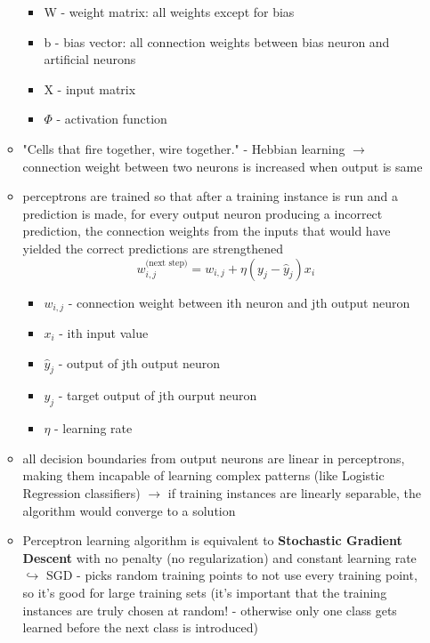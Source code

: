 \documentclass[12pt,a4paper]{article}
\begin{document}
\begin{itemize}
\begin{itemize}
    \begin{itemize}
      \item W - weight matrix: all weights except for bias
      \item b - bias vector: all connection weights between bias neuron and artificial neurons
      \item X - input matrix
      \item $\Phi$ - activation function
    \end{itemize}
    \item "Cells that fire together, wire together." - Hebbian learning
    \newline \indent $\longrightarrow$ connection weight between two neurons is increased when output is same
    \item perceptrons are trained so that after a training instance is run and a prediction is made, for every output neuron producing a incorrect prediction, the connection weights from the inputs that would have yielded the correct predictions are strengthened
    \begin{equation}
      w_{i, j}^{\text{(next step)}} = w_{i, j} + \eta(y_j - \hat y_j) x_i
    \end{equation}
    \begin{itemize}
      \item $w_{i, j}$ - connection weight between ith neuron and jth output neuron
      \item $x_i$ - ith input value
      \item $\hat y_j$ - output of jth output neuron
      \item $y_j$ - target output of jth ourput neuron
      \item $\eta$ - learning rate
    \end{itemize}
    \item all decision boundaries from output neurons are linear in perceptrons, making them incapable of learning complex patterns (like Logistic Regression classifiers)
    \newline \indent $\longrightarrow$ if training instances are linearly separable, the algorithm would converge to a solution
    \item Perceptron learning algorithm is equivalent to \textbf{Stochastic Gradient Descent} with no penalty (no regularization) and constant learning rate
    \newline \indent $\hookrightarrow$ SGD - picks random training points to not use every training point, so it's good for large training sets (it's important that the training instances are truly chosen at random! - otherwise only one class gets learned before the next class is introduced) 

\end{itemize}
\end{itemize}
\end{document}
